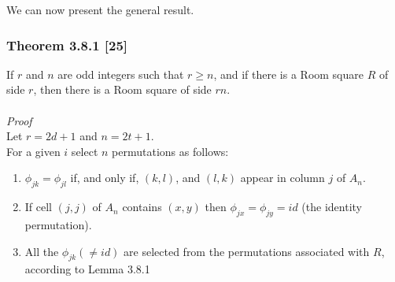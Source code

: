 \documentclass[
  12pt,
  a4paper]{book}
\begin{document}
We can now present the general result.

\hypertarget{theorem-3.8.1-25}{%
\subsubsection{Theorem 3.8.1 {[}25{]}}\label{theorem-3.8.1-25}}

If \(r\) and \(n\) are odd integers such that \(r \geq n\), and if there
is a Room square \(R\) of side \(r\), then there is a Room square of
side \(rn\).\\
~\\
\emph{Proof}\\
Let \(r=2d+1\) and \(n=2t+1\).\\
For a given \(i\) select \(n\) permutations as follows:

\begin{enumerate}
\def\labelenumi{\arabic{enumi}.}
\item
  \(\phi _{jk} = \phi _{jl}\) if, and only if, \((k,l)\), and \((l,k)\)
  appear in column \(j\) of \(A_n\).
\item
  If cell \((j,j)\) of \(A_n\) contains \((x,y)\) then
  \(\phi _{jx}=\phi _{jy}=id\) (the identity permutation).
\item
  All the \(\phi _{jk} (\neq id)\) are selected from the permutations
  associated with \(R\), according to Lemma 3.8.1
\end{enumerate}
\end{document}
